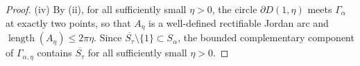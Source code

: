 \documentclass[11pt]{amsart}
\numberwithin{equation}{section}
\theoremstyle{definition}
\theoremstyle{plain}
\begin{document}
\begin{proof}


(iv) By (ii), for all sufficiently small \(\eta>0\), the circle
\(\partial D(1,\eta)\) meets \(\Gamma_\alpha\) at exactly two points,
so that \(A_\eta\) is a well-defined rectifiable Jordan arc and
\(\operatorname{length}(A_\eta)\le 2\pi\eta\).
Since
\(\overline{S_\tau}\setminus\{1\}\subset S_\alpha\), 
the bounded complementary component of
$\Gamma_{\alpha, \eta}$
contains \(\overline{S_\tau}\) for all
sufficiently small \(\eta>0\).



\end{proof}
\end{document}
